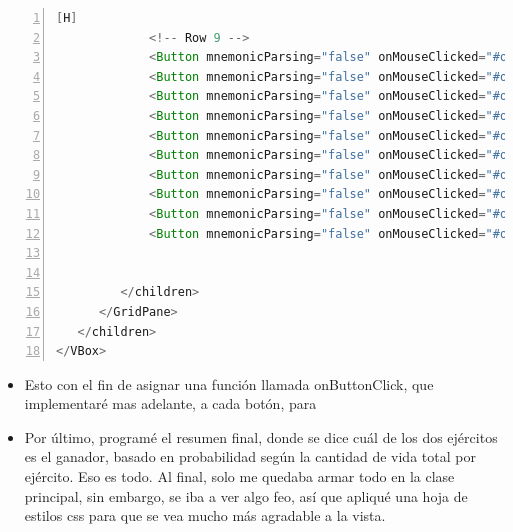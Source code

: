 \documentclass{article}
\begin{document}
\begin{lstlisting}[language=java,caption={Archivo FXML}, numbers=left][H]
             <!-- Row 9 -->
             <Button mnemonicParsing="false" onMouseClicked="#onButtonClick" styleClass="button" text="" GridPane.columnIndex="0" GridPane.rowIndex="9" />
             <Button mnemonicParsing="false" onMouseClicked="#onButtonClick" styleClass="button" text="" GridPane.columnIndex="1" GridPane.rowIndex="9" />
             <Button mnemonicParsing="false" onMouseClicked="#onButtonClick" styleClass="button" text="" GridPane.columnIndex="2" GridPane.rowIndex="9" />
             <Button mnemonicParsing="false" onMouseClicked="#onButtonClick" styleClass="button" text="" GridPane.columnIndex="3" GridPane.rowIndex="9" />
             <Button mnemonicParsing="false" onMouseClicked="#onButtonClick" styleClass="button" text="" GridPane.columnIndex="4" GridPane.rowIndex="9" />
             <Button mnemonicParsing="false" onMouseClicked="#onButtonClick" styleClass="button" text="" GridPane.columnIndex="5" GridPane.rowIndex="9" />
             <Button mnemonicParsing="false" onMouseClicked="#onButtonClick" styleClass="button" text="" GridPane.columnIndex="6" GridPane.rowIndex="9" />
             <Button mnemonicParsing="false" onMouseClicked="#onButtonClick" styleClass="button" text="" GridPane.columnIndex="7" GridPane.rowIndex="9" />
             <Button mnemonicParsing="false" onMouseClicked="#onButtonClick" styleClass="button" text="" GridPane.columnIndex="8" GridPane.rowIndex="9" />
             <Button mnemonicParsing="false" onMouseClicked="#onButtonClick" styleClass="button" text="" GridPane.columnIndex="9" GridPane.rowIndex="9" />


         </children>
      </GridPane>
   </children>
</VBox>

	\end{lstlisting}
	\begin{itemize}	
		\item Esto con el fin de asignar una función llamada onButtonClick, que implementaré mas adelante, a cada botón, para 
		\item Por último, programé el resumen final, donde se dice cuál de los dos ejércitos es el ganador, basado en probabilidad según la cantidad de vida total por ejército. Eso es todo. Al final, solo me quedaba armar todo en la clase principal, sin embargo, se iba a ver algo feo, así que apliqué una hoja de estilos css para que se vea mucho más agradable a la vista.
	\end{itemize}
\end{document}

